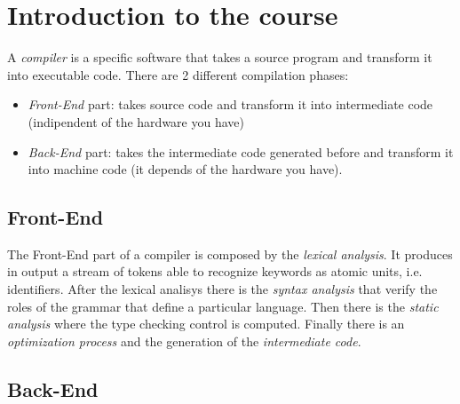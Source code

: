 \chapter{Introduction to the course}

A \textit{compiler} is a specific software that takes a source program and transform it into executable code. There are 2 different compilation phases:
\begin{itemize}
\item \textit{Front-End} part: takes source code and transform it into intermediate code (indipendent of the hardware you have)
\item \textit{Back-End} part: takes the intermediate code generated before and transform it into machine code (it depends of the hardware you have).
\end{itemize}

\section{Front-End}

The Front-End part of a compiler is composed by the \textit{lexical analysis}. It produces in output a stream of tokens able to recognize keywords as atomic units, i.e. identifiers.
After the lexical analisys there is the \textit{syntax analysis} that verify the roles of the grammar that define a particular language.
Then there is the \textit{static analysis} where the type checking control is computed. Finally there is an \textit{optimization process} and the generation of the \textit{intermediate code}.







\section{Back-End}

